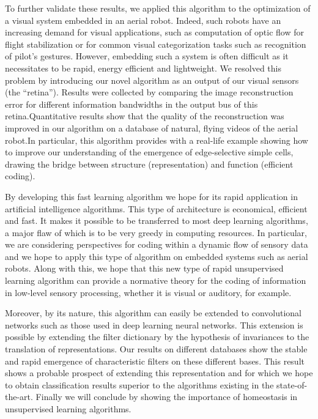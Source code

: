 \documentclass[a4paper, 11pt, draft]{article} %
\newcommand{\Acknowledgments}{%
This work was supported by XXX and the Doc2Amu project which received funding from a co-fund with the European Union's Horizon 2020 research and innovation programme and the region Provence Alpes Cote d'Azur. }
\begin{document}

To further validate these results, we applied this algorithm to the optimization of a visual system embedded in an aerial robot. Indeed, such robots have an increasing demand for visual applications, such as computation of optic flow for flight stabilization or for common visual categorization tasks such as recognition of pilot's gestures. However, embedding such a system is often difficult as it necessitates to be rapid,  energy efficient and lightweight. We resolved this problem by introducing our novel algorithm as an output of our visual sensors (the ``retina''). Results were collected by comparing the image reconstruction error for different information bandwidths in the output bus of this retina.Quantitative results show that the quality of the reconstruction was improved in our algorithm on a  database of natural, flying videos of the aerial robot.In particular, this algorithm provides with a real-life example showing how to improve our understanding of the emergence of edge-selective simple cells, drawing the bridge between structure (representation) and function (efficient coding).%
%


 By developing this
fast learning algorithm we hope for its rapid application in artificial
intelligence algorithms. This type of architecture is economical,
efficient and fast. It makes it possible to be transferred to most deep
learning algorithms, a major flaw of which is to be very greedy in
computing resources. In particular, we are considering perspectives for
coding within a dynamic flow of sensory data and we hope to apply this
type of algorithm on embedded systems such as aerial robots. Along with
this, we hope that this new type of rapid unsupervised learning
algorithm can provide a normative theory for the coding of information
in low-level sensory processing, whether it is visual or auditory, for
example.

Moreover, by its nature, this algorithm can easily be extended to convolutional networks such as those used in deep learning neural networks. This extension is possible by extending the filter dictionary by the hypothesis of invariances to the translation of representations. Our results on different databases show the stable and rapid emergence of characteristic filters on these different bases. This result shows a probable prospect of extending this representation and for which we hope to obtain classification results superior to the algorithms existing in the state-of-the-art. Finally we will conclude by showing the importance of homeostasis in unsupervised learning algorithms.



\printbibliography
\end{document}
